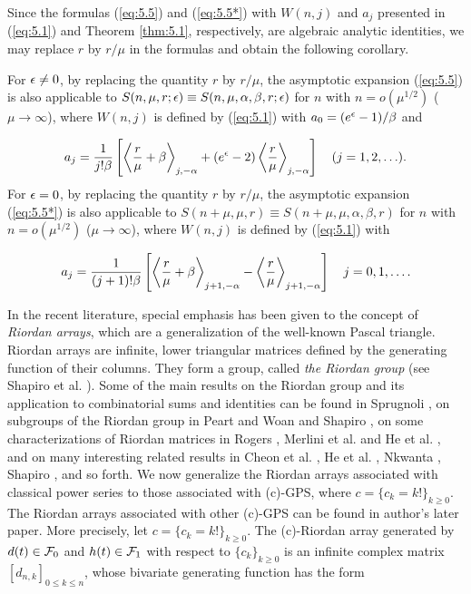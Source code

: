 Since the formulas (\ref{eq:5.5}) and (\ref{eq:5.5*}) with $W(n,j)$ and $a_j$ presented in (\ref{eq:5.1}) and Theorem \ref{thm:5.1}, respectively, are algebraic analytic identities, we may replace $r$ by $r/\mu$ in the formulas and obtain the following corollary.

\begin{corollary}
For ${\epsilon}\not= 0$, by replacing the quantity $r$ by $r/\mu$, the asymptotic expansion (\ref{eq:5.5}) is also applicable to $S(n,\mu, r;{\epsilon})\equiv S(n, \mu, \alpha, \beta,r; {\epsilon})$ for $n$ with $n=o(\mu^{1/2})$ ($\mu\to \infty$), where $W(n,j)$ is defined by (\ref{eq:5.1}) with $a_0=(e^{\epsilon} -1)/\beta$ and

\[
a_j=\frac{1}{j!\beta} \left[\left \langle \frac{r}{\mu}+\beta\right \rangle_{j,-\alpha}+(e^{\epsilon} -2)\left \langle \frac{r}{\mu}\right\rangle_{j,-\alpha}\right]\quad (j=1,2,\ldots).
\]
For ${\epsilon}=0$, by replacing the quantity $r$ by $r/\mu$, the asymptotic expansion (\ref{eq:5.5*}) is also applicable to   $S(n+\mu,\mu,  r)\equiv S(n+\mu, \mu, \alpha, \beta,r)$ for $n$ with $n=o(\mu^{1/2})$ ($\mu\to \infty$), where $W(n,j)$ is defined by (\ref{eq:5.1}) with

\[
a_j=\frac{1}{(j+1)!\beta} \left[ \left \langle \frac{r}{\mu}+\beta\right \rangle_{j+1, -\alpha}-\left \langle \frac{r}{\mu}\right\rangle_{j+1, -\alpha}\right]\quad j=0,1,\ldots.
\]
\end{corollary}

In the recent literature, special emphasis has been given to the concept of {\em Riordan arrays},
which are a generalization of the well-known Pascal triangle. Riordan arrays are infinite, lower
triangular matrices defined by the generating function of their columns. They form a group, called
{\em the Riordan group} (see Shapiro et al. \cite{SGWW}). Some of the main results on the Riordan
group and its application to combinatorial sums and identities can be found in Sprugnoli
\cite{Spr1, Spr2}, on subgroups of the Riordan group in Peart and Woan \cite{PW} and Shapiro
\cite{Sha0}, on some characterizations of Riordan matrices in Rogers \cite{Rog}, Merlini et al.
\cite{MRSV} and He et al. \cite{HS09}, and on many interesting related results in Cheon et al. \cite{CKS, CKS2}, He et al. \cite{HHS}, Nkwanta \cite{Nkw}, Shapiro \cite{Sha1, Sha2}, and so forth. We now generalize the Riordan arrays associated with classical power series to those associated with (c)-GPS, where $c=\{ c_k=k!\}_{k\geq 0}$. The Riordan arrays associated with other (c)-GPS can be found in author's later paper. More precisely, let $c=\{ c_k=k!\}_{k\geq 0}$. The (c)-Riordan array generated by $d(t)\in {\cal F}_0$ and $h(t)\in {\cal F}_1$ with respect to $\{ c_k\}_{k\geq 0}$ is an infinite complex matrix $[d_{n,k}]_{0\leq k\leq n}$, whose bivariate generating function has the form

